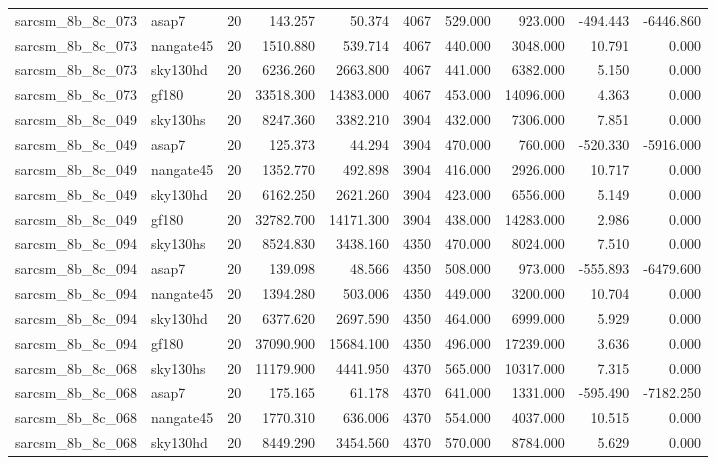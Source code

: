 \begin{tabular}{llrrrrrrrr}
sarcsm\_8b\_8c\_073 & asap7 & 20 & 143.257 & 50.374 & 4067 & 529.000 & 923.000 & -494.443 & -6446.860 \\
sarcsm\_8b\_8c\_073 & nangate45 & 20 & 1510.880 & 539.714 & 4067 & 440.000 & 3048.000 & 10.791 & 0.000 \\
sarcsm\_8b\_8c\_073 & sky130hd & 20 & 6236.260 & 2663.800 & 4067 & 441.000 & 6382.000 & 5.150 & 0.000 \\
sarcsm\_8b\_8c\_073 & gf180 & 20 & 33518.300 & 14383.000 & 4067 & 453.000 & 14096.000 & 4.363 & 0.000 \\
sarcsm\_8b\_8c\_049 & sky130hs & 20 & 8247.360 & 3382.210 & 3904 & 432.000 & 7306.000 & 7.851 & 0.000 \\
sarcsm\_8b\_8c\_049 & asap7 & 20 & 125.373 & 44.294 & 3904 & 470.000 & 760.000 & -520.330 & -5916.000 \\
sarcsm\_8b\_8c\_049 & nangate45 & 20 & 1352.770 & 492.898 & 3904 & 416.000 & 2926.000 & 10.717 & 0.000 \\
sarcsm\_8b\_8c\_049 & sky130hd & 20 & 6162.250 & 2621.260 & 3904 & 423.000 & 6556.000 & 5.149 & 0.000 \\
sarcsm\_8b\_8c\_049 & gf180 & 20 & 32782.700 & 14171.300 & 3904 & 438.000 & 14283.000 & 2.986 & 0.000 \\
sarcsm\_8b\_8c\_094 & sky130hs & 20 & 8524.830 & 3438.160 & 4350 & 470.000 & 8024.000 & 7.510 & 0.000 \\
sarcsm\_8b\_8c\_094 & asap7 & 20 & 139.098 & 48.566 & 4350 & 508.000 & 973.000 & -555.893 & -6479.600 \\
sarcsm\_8b\_8c\_094 & nangate45 & 20 & 1394.280 & 503.006 & 4350 & 449.000 & 3200.000 & 10.704 & 0.000 \\
sarcsm\_8b\_8c\_094 & sky130hd & 20 & 6377.620 & 2697.590 & 4350 & 464.000 & 6999.000 & 5.929 & 0.000 \\
sarcsm\_8b\_8c\_094 & gf180 & 20 & 37090.900 & 15684.100 & 4350 & 496.000 & 17239.000 & 3.636 & 0.000 \\
sarcsm\_8b\_8c\_068 & sky130hs & 20 & 11179.900 & 4441.950 & 4370 & 565.000 & 10317.000 & 7.315 & 0.000 \\
sarcsm\_8b\_8c\_068 & asap7 & 20 & 175.165 & 61.178 & 4370 & 641.000 & 1331.000 & -595.490 & -7182.250 \\
sarcsm\_8b\_8c\_068 & nangate45 & 20 & 1770.310 & 636.006 & 4370 & 554.000 & 4037.000 & 10.515 & 0.000 \\
sarcsm\_8b\_8c\_068 & sky130hd & 20 & 8449.290 & 3454.560 & 4370 & 570.000 & 8784.000 & 5.629 & 0.000 \\

\end{tabular}
